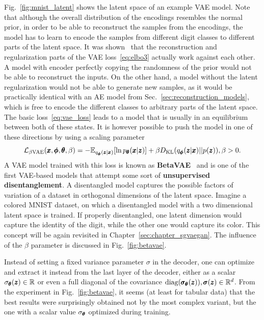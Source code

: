 Fig.~\ref{fig:mnist_latent} shows the latent space of an example VAE model. Note that although the overall distribution of the encodings resembles the normal prior, in order to be able to reconstruct the samples from the encodings, the model has to learn to encode the samples from different digit classes to different parts of the latent space. It was shown~\cite{higgins2017beta} that the reconstruction and regularization parts of the VAE loss~\eqref{eq:elbo3} actually work against each other. A model with encoder perfectly copying the randomness of the prior would not be able to reconstruct the inputs. On the other hand, a model without the latent regularization would not be able to generate new samples, as it would be practically identical with an AE model from Sec.~\ref{sec:reconstruction_models}, which is free to encode the different classes to arbitrary parts of the latent space. The basic loss~\eqref{eq:vae_loss} leads to a model that is usually in an equilibrium between both of these states. It is however possible to push the model in one of these directions by using a scaling parameter
\begin{equation} \label{eq:betavae}
\mathcal{L}_{\beta\text{VAE}}(\vc{x},\vc{\phi},\vc{\theta},\beta)= - \mathbb{E}_{q_{\vc{\phi}}(\vc{z}|\vc{x})}\left[\ln p_{\vc{\theta}}(\vc{x}|\vc{z})\right] + \beta D_{\text{KL}}\left(q_{\vc{\phi}}(\vc{z}|\vc{x})||p(\vc{z})\right),\beta>0.
\end{equation}
A VAE model trained with this loss is known as \textbf{BetaVAE}~\cite{higgins2017beta} and is one of the first VAE-based models that attempt some sort of \textbf{unsupervised disentanglement}. A disentangled model captures the possible factors of variation of a dataset in orthogonal dimensions of the latent space. Imagine a colored MNIST dataset, on which a disentangled model with a two dimensional latent space is trained. If properly disentangled, one latent dimension would capture the identity of the digit, while the other one would capture its color. This concept will be again revisited in Chapter~\ref{sec:chapter_sgvaegan}. The influence of the $\beta$ parameter is discussed in Fig.~\ref{fig:betavae}.

Instead of setting a fixed variance parameter $\sigma$ in the decoder, one can optimize and extract it instead from the last layer of the decoder, either as a scalar $\sigma_{\pmb{{\theta}}}(\pmb{{z}}) \in \mathbb{R}$
or even a full diagonal of the covariance $\text{diag}\left(\vc{\sigma}_{\vc{\theta}}(\vc{z})\right),\vc{\sigma}(\vc{z})\in\mathbb{R}^{d}$. From the experiment in Fig.~\ref{fig:betavae}, it seems (at least for tabular data) that the best results were surprisingly obtained not by the most complex variant, but the one with a scalar value $\sigma_{\pmb{{\theta}}}$ optimized during training.


